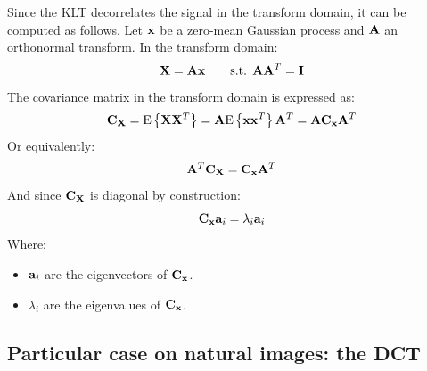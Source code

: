 \documentclass[11pt,a4paper,openright,twoside]{book}
\numberwithin{equation}{section} %
\begin{document}
Since the \ac{KLT} decorrelates the signal in the transform domain, it
can be computed as follows.
Let $\mathbf{x}$ be a zero-mean Gaussian process and $\mathbf{A}$ an orthonormal transform.
In the transform domain:
\begin{equation}
	\mathbf{X} = \mathbf{A} \mathbf{x} \qquad \text{s.t. } \mathbf{A} \mathbf{A}^T = \mathbf{I}
\end{equation}
The covariance matrix in the transform domain is expressed as:
\begin{equation}
	\mathbf{C}_{\mathbf{X}} = \text{E}\left\{\mathbf{X} \mathbf{X}^T\right\} = \mathbf{A} \text{E}\left\{\mathbf{x}\mathbf{x}^T\right\}\mathbf{A}^T =
	\mathbf{A}\mathbf{C}_{\mathbf{x}}\mathbf{A}^T
\end{equation}
Or equivalently:
\begin{equation}
	\mathbf{A}^T\mathbf{C}_{\mathbf{X}} = \mathbf{C}_{\mathbf{x}}\mathbf{A}^T
\end{equation}
And since $\mathbf{C}_{\mathbf{X}}$ is diagonal by construction:
\begin{equation}
	\mathbf{C}_{\mathbf{x}} \mathbf{a}_i = \lambda_i\mathbf{a}_i
\end{equation}
Where:
\begin{itemize}
	\item $\mathbf{a}_i$ are the eigenvectors of $\mathbf{C}_{\mathbf{x}}$.
	\item $\lambda_i$ are the eigenvalues of $\mathbf{C}_{\mathbf{x}}$.
\end{itemize}

\subsection{Particular case on natural images: the \acs{DCT}}
\label{sub:particular_case_dct}
\end{document}
